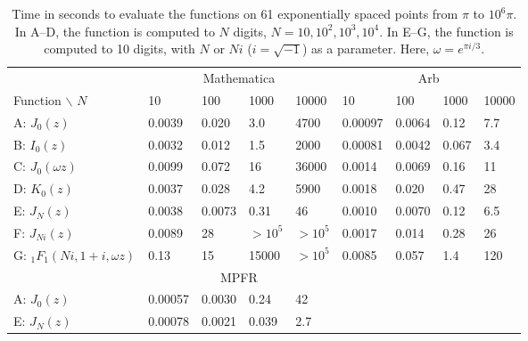 \documentclass[review,nohypdvips]{siamart0216}
\begin{document}
\begin{table}
\renewcommand{\arraystretch}{1.4}
\setlength{\tabcolsep}{.4em}
\begin{center}
\caption{Time in seconds to evaluate the functions on 61 exponentially spaced points from $\pi$ to $10^6 \pi$.
In A--D, the function is computed to $N$ digits, $N = 10, 10^2, 10^3, 10^4$.
In E--G, the function is computed to 10 digits, with $N$ or $Ni$ ($i = \sqrt{-1}$) as a parameter. Here, $\omega = e^{\pi i / 3}$.}
\begin{scriptsize}
\begin{tabular}{l | l l l l | l l l l}
                                  & \multicolumn{4}{|c|}{Mathematica} & \multicolumn{4}{|c}{Arb} \\
Function $\backslash$ $N$         &  10       & 100       & 1000 & 10000 &  10 & 100 & 1000 & 10000  \\ \hline
A: $J_0(z)$              &  0.0039   &  0.020    & 3.0     & 4700      &  0.00097   &  0.0064  &  0.12   &  7.7  \\
B: $I_0(z)$             &   0.0032   &  0.012    & 1.5     & 2000  &  0.00081   &  0.0042  &  0.067  &  3.4  \\
C: $J_0(\omega z)$      &   0.0099   &  0.072    & 16     & 36000      &  0.0014    &  0.0069  &  0.16   &  11   \\
D: $K_0(z)$             &   0.0037   &  0.028    & 4.2     &  5900  &  0.0018    &  0.020   &  0.47   &  28   \\
E: $J_N(z)$            &   0.0038   &  0.0073   & 0.31  &  46  &  0.0010    &  0.0070  &  0.12   &  6.5  \\
F: $J_{Ni}(z)$         &   0.0089   &  28       & $>10^5$     &   $>10^5$  &  0.0017    &  0.014   &  0.28   &  26   \\
G: ${}_1F_1(Ni,1+i,\omega z)$     &   0.13     &  15       & 15000     &  $>10^5$   &  0.0085    &  0.057   &  1.4    &  120    \\ \hline
           &   \multicolumn{4}{|c|}{MPFR} & \multicolumn{4}{|c}{ } \\ \hline
A: $J_0(z)$   & 0.00057  &  0.0030   &  0.24  &  42 & & & & \\
E: $J_N(z)$   & 0.00078  &  0.0021   &  0.039 &  2.7 & & & & \\
\end{tabular}
\end{scriptsize}
\label{tab:ultrabenchmark}
\end{center}
\end{table}
\end{document}
